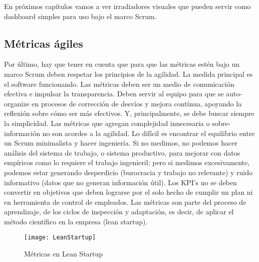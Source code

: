 En próximos capítulos vamos a ver irradiadores visuales que pueden servir como dashboard simples para uso bajo el marco Scrum.

\subsection{Métricas ágiles}

Por último, hay que tener en cuenta que para que las métricas estén bajo un marco Scrum deben respetar los principios de la agilidad. La medida principal es el software funcionando. Las métricas deben ser un medio de comunicación efectiva e impulsar la transparencia. Deben servir al equipo para que se auto-organize en procesos de corrección de desvíos y mejora contínua, apoyando la reflexión sobre cómo ser más efectivos. Y, principalmente, se debe buscar siempre la simplicidad. Las métricas que agregan complejidad innecesaria o sobre-información no son acordes a la agilidad. Lo difícil es encontrar el equilibrio entre un Scrum minimalista y hacer ingeniería. Si no medimos, no podemos hacer análisis del sistema de trabajo, o sistema productivo, para mejorar con datos empíricos como lo requiere el trabajo ingenieril; pero si medimos excesivamente, podemos estar generando desperdicio (burocracia y trabajo no relevante) y ruido informativo (datos que no generan información útil). Los KPI's no se deben convertir en objetivos que deben lograrse por el solo hecho de cumplir un plan ni en herramienta de control de empleados. Las métricas son parte del proceso de aprendizaje, de los ciclos de inspección y adaptación, es decir, de aplicar el método científico en la empresa (lean startup).

\begin{figure}[h]
  \centering
  \texttt{[image: LeanStartup]}
  \caption{Métricas en Lean Startup}
  \centering
  \label{fig:LeanStartup} %
\end{figure}
\FloatBarrier %
